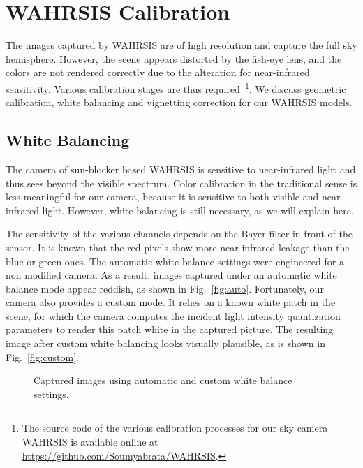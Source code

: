 \section{WAHRSIS Calibration} 
\label{sec:WSI-calibration}
The images captured by WAHRSIS are of high resolution and capture the full sky hemisphere. However, the scene appears distorted by the fish-eye lens, and the colors are not rendered correctly due to the alteration for near-infrared sensitivity. Various calibration stages are thus required~\footnote{The source code of the various calibration processes for our sky camera WAHRSIS is available online at \url{https://github.com/Soumyabrata/WAHRSIS}.}. We discuss geometric calibration, white balancing and vignetting correction for our WAHRSIS models.

\subsection{White Balancing}
\label{sec:white_balancing}
The camera of sun-blocker based WAHRSIS is sensitive to near-infrared light and thus sees beyond the visible spectrum. Color calibration in the traditional sense is less meaningful for our camera, because it is sensitive to both visible and near-infrared light. However, white balancing is still necessary, as we will explain here.

The sensitivity of the various channels depends on the Bayer filter in front of the sensor. It is known that the red pixels show more near-infrared leakage than the blue or green ones. The automatic white balance settings were engineered for a non modified camera. As a result, images captured under an automatic white balance mode appear reddish, as shown in Fig.~\ref{fig:auto}. Fortunately, our camera also provides a custom mode. It relies on a known white patch in the scene, for which the camera computes the incident light intensity quantization parameters to render this patch white in the captured picture. The resulting image after custom white balancing looks visually plausible, as is shown in Fig.~\ref{fig:custom}.

\begin{figure}[htb]
\centering
{}
\caption{Captured images using automatic and custom white balance settings.}\label{fig:wb}
\end{figure}

